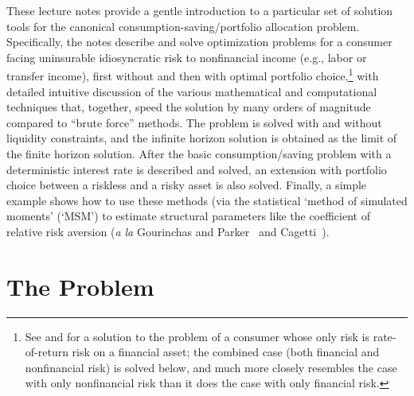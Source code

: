 \documentclass[titlepage, headings=optiontotocandhead]{\econtex}
\begin{document}
These lecture notes provide a gentle introduction to a particular set
of solution tools for the canonical consumption-saving/portfolio allocation problem.
Specifically, the notes describe and solve optimization problems for a
consumer facing uninsurable idiosyncratic risk to nonfinancial income
(e.g., labor or transfer income), first without and then with optimal portfolio choice,\footnote{See
  \cite{merton:restat} and \cite{samuelson:portfolio} for a solution
  to the problem of a consumer whose only risk is rate-of-return risk
  on a financial asset; the combined case (both financial and
  nonfinancial risk) is solved below, and much more closely resembles
  the case with only nonfinancial risk than it does the case with only
  financial risk.}  with detailed intuitive discussion of the various
mathematical and computational techniques that, together, speed the
solution by many orders of magnitude compared to
``brute force'' methods.  The problem is solved with and without
liquidity constraints, and the infinite horizon solution is
obtained as the limit of the finite horizon solution.  After the basic
consumption/saving problem with a deterministic interest rate is
described and solved, an extension with portfolio choice between a
riskless and a risky asset is also solved.  Finally, a simple example
shows how to use these methods (via the statistical `method
of simulated moments' (`MSM') to estimate structural parameters like the
coefficient of relative risk aversion (\textit{a la} Gourinchas and
Parker~\citeyearpar{gpLifecycle} and
Cagetti~\citeyearpar{cagettiWprofiles}).  %

\renewcommand{\DiscAlt}{\beta} %
\hypertarget{the-problem}{}
\section{The Problem}\label{sec:the-problem}
\end{document}
